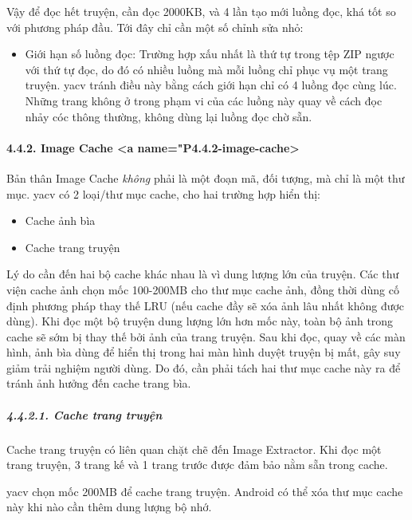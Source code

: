 \documentclass[
]{article}
\providecommand{\tightlist}{%
  \setlength{\itemsep}{0pt}\setlength{\parskip}{0pt}}
\begin{document}
Vậy để đọc hết truyện, cần đọc 2000KB, và 4 lần tạo mới luồng đọc, khá
tốt so với phương pháp đầu. Tới đây chỉ cần một số chỉnh sửa nhỏ:

\begin{itemize}
\tightlist
\item
  Giới hạn số luồng đọc: Trường hợp xấu nhất là thứ tự trong tệp ZIP
  ngược với thứ tự đọc, do đó có nhiều luồng mà mỗi luồng chỉ phục vụ
  một trang truyện. yacv tránh điều này bằng cách giới hạn chỉ có 4
  luồng đọc cùng lúc. Những trang không ở trong phạm vi của các luồng
  này quay về cách đọc nhảy cóc thông thường, không dùng lại luồng đọc
  chờ sẵn.
\end{itemize}

\hypertarget{image-cache-a-namep4.4.2-image-cache}{%
\paragraph{4.4.2. Image Cache \textless a
name="P4.4.2-image-cache\textgreater{}}\label{image-cache-a-namep4.4.2-image-cache}}

Bản thân Image Cache \emph{không} phải là một đoạn mã, đối tượng, mà chỉ
là một thư mục. yacv có 2 loại/thư mục cache, cho hai trường hợp hiển
thị:

\begin{itemize}
\tightlist
\item
  Cache ảnh bìa
\item
  Cache trang truyện
\end{itemize}

Lý do cần đến hai bộ cache khác nhau là vì dung lượng lớn của truyện.
Các thư viện cache ảnh chọn mốc 100-200MB cho thư mục cache ảnh, đồng
thời dùng cố định phương pháp thay thế LRU (nếu cache đầy sẽ xóa ảnh lâu
nhất không được dùng). Khi đọc một bộ truyện dung lượng lớn hơn mốc này,
toàn bộ ảnh trong cache sẽ sớm bị thay thế bởi ảnh của trang truyện. Sau
khi đọc, quay về các màn hình, ảnh bìa dùng để hiển thị trong hai màn
hình duyệt truyện bị mất, gây suy giảm trải nghiệm người dùng. Do đó,
cần phải tách hai thư mục cache này ra để tránh ảnh hưởng đến cache
trang bìa.

\hypertarget{cache-trang-truyux1ec7n}{%
\subparagraph{4.4.2.1. Cache trang
truyện}\label{cache-trang-truyux1ec7n}}

Cache trang truyện có liên quan chặt chẽ đến Image Extractor. Khi đọc
một trang truyện, 3 trang kế và 1 trang trước được đảm bảo nằm sẵn trong
cache.

yacv chọn mốc 200MB để cache trang truyện. Android có thể xóa thư mục
cache này khi nào cần thêm dung lượng bộ nhớ.
\end{document}

